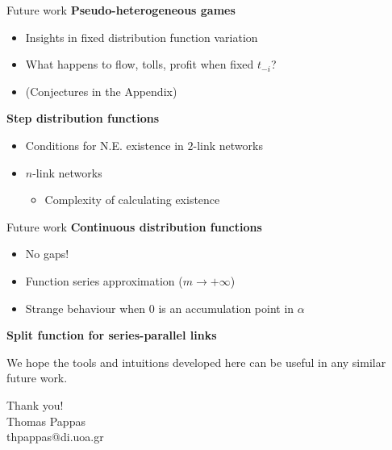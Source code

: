 \documentclass[handout]{beamer}
\begin{document}
\begin{frame}{Future work}
	\textbf{Pseudo-heterogeneous games}\pause
	\begin{itemize}
		\item Insights in fixed distribution function variation\pause
		\item What happens to flow, tolls, profit when fixed $t_{-i}$?\pause
		\item (Conjectures in the Appendix)
	\end{itemize}\pause

	\textbf{Step distribution functions}\pause
	\begin{itemize}
		\item Conditions for N.E. existence in $2$-link networks\pause
		\item $n$-link networks\pause
		\begin{itemize}
			\item Complexity of calculating existence
		\end{itemize}
	\end{itemize}
\end{frame}

\begin{frame}{Future work}
	\textbf{Continuous distribution functions}\pause
	\begin{itemize}
		\item No gaps!\pause
		\item Function series approximation ($m \rightarrow +\infty$)\pause
		\item Strange behaviour when $0$ is an accumulation point in $\alpha$
	\end{itemize}\pause

	\textbf{Split function for series-parallel links}\pause

	We hope the tools and intuitions developed here can be useful in any similar future work.
\end{frame}

\begin{frame}{}
	\centering
    \huge Thank you!\\
    \normalsize Thomas Pappas\\
    thpappas@di.uoa.gr
\end{frame}
\end{document}
